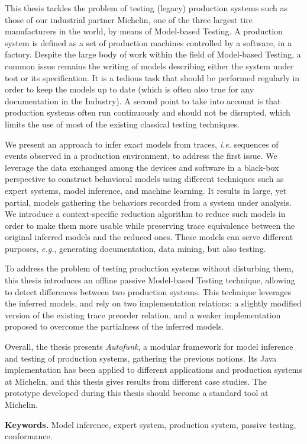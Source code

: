 This thesis tackles the problem of testing (legacy) production
systems such as those of our industrial partner Michelin, one of
the three largest tire manufacturers in the world, by means of
Model-based Testing. A production system is defined as a set of
production machines controlled by a software, in a factory.
Despite the large body of work within the field of Model-based
Testing, a common issue remains the writing of models describing
either the system under test or its specification. It is a
tedious task that should be performed regularly in order to keep
the models up to date (which is often also true for any
documentation in the Industry). A second point to take into
account is that production systems often run continuously and
should not be disrupted, which limits the use of most of the
existing classical testing techniques.

We present an approach to infer exact models from traces,
\emph{i.e.} sequences of events observed in a production
environment, to address the first issue. We leverage the data
exchanged among the devices and software in a black-box
perspective to construct behavioral models using different
techniques such as expert systems, model inference, and machine
learning. It results in large, yet partial, models gathering the
behaviors recorded from a system under analysis. We introduce a
context-specific reduction algorithm to reduce such models in
order to make them more usable while preserving trace equivalence
between the original inferred models and the reduced ones. These
models can serve different purposes, \emph{e.g.}, generating
documentation, data mining, but also testing.

To address the problem of testing production systems without
disturbing them, this thesis introduces an offline passive
Model-based Testing technique, allowing to detect differences
between two production systems. This technique leverages the
inferred models, and rely on two implementation relations: a
slightly modified version of the existing trace preorder
relation, and a weaker implementation proposed to overcome the
partialness of the inferred models.

Overall, the thesis presents \emph{Autofunk}, a modular framework
for model inference and testing of production systems, gathering
the previous notions. Its Java implementation has been applied to
different applications and production systems at Michelin, and
this thesis gives results from different case studies. The
prototype developed during this thesis should become a standard
tool at Michelin.

\textbf{Keywords.} Model inference, expert system, production
system, passive testing, conformance.
